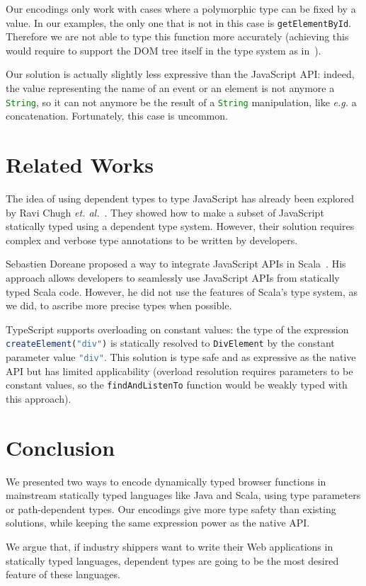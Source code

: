 \documentclass{llncs}
\newcommand{\jscode}[1]{\lstinline[language=JavaScript]|#1|}
\begin{document}
Our encodings only work with cases where a polymorphic type can be fixed by a value. In our examples, the only one that is not in this case is \jscode{getElementById}. Therefore we are not able to type this function more accurately (achieving this would require to support the DOM tree itself in the type system as in~\cite{Lerner13_TypedJQuery}).

Our solution is actually slightly less expressive than the JavaScript API: indeed, the value representing the name of an event or an element is not anymore a \jscode{String}, so it can not anymore be the result of a \jscode{String} manipulation, like \emph{e.g.} a concatenation. Fortunately, this case is uncommon.

\section{Related Works}
\label{sec-related}

The idea of using dependent types to type JavaScript has already been explored by Ravi Chugh \emph{et. al.}~\cite{Chugh12_DJS}. They showed how to make a subset of JavaScript statically typed using a dependent type system. However, their solution requires complex and verbose type annotations to be written by developers.

Sebastien Doreane proposed a way to integrate JavaScript APIs in Scala~\cite{Doeraene13_ScalaJs}. His approach allows developers to seamlessly use JavaScript APIs from statically typed Scala code. However, he did not use the features of Scala's type system, as we did, to ascribe more precise types when possible.

TypeScript supports overloading on constant values: the type of the expression \jscode{createElement("div")} is statically resolved to \jscode{DivElement} by the constant parameter value \jscode{"div"}. This solution is type safe and as expressive as the native API but has limited applicability (overload resolution requires parameters to be constant values, so the \jscode{findAndListenTo} function would be weakly typed with this approach).

\section{Conclusion}
\label{sec-conclusion}

We presented two ways to encode dynamically typed browser functions in mainstream statically typed languages like Java and Scala, using type parameters or path-dependent types. Our encodings give more type safety than existing solutions, while keeping the same expression power as the native API.

We argue that, if industry shippers want to write their Web applications in statically typed languages, dependent types are going to be the most desired feature of these languages.



\end{document}

